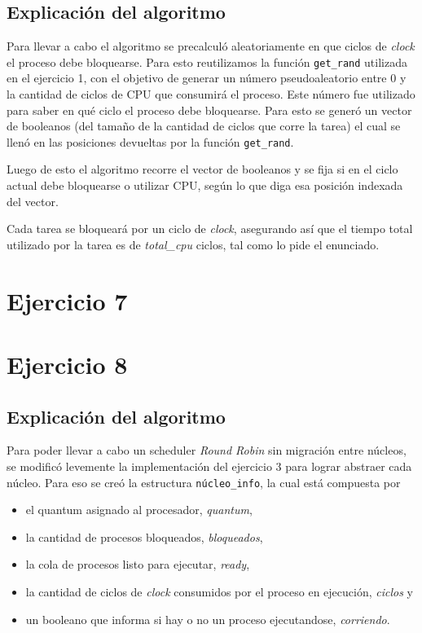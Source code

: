\documentclass[a4paper]{article}
\begin{document}
\subsection{Explicación del algoritmo}
Para llevar a cabo el algoritmo se precalculó aleatoriamente en que ciclos
de \textit{clock} el proceso debe bloquearse. Para esto reutilizamos la
función \verb|get_rand| utilizada en el ejercicio 1, con el objetivo de
generar un número pseudoaleatorio entre 0 y la cantidad de ciclos de CPU que
consumirá el proceso. Este número fue utilizado para saber en qué ciclo el
proceso debe bloquearse. Para esto se generó un vector de booleanos (del
tamaño de la cantidad de ciclos que corre la tarea) el cual se llenó en las
posiciones devueltas por la función \verb|get_rand|.

Luego de esto el algoritmo recorre el vector de booleanos y se fija si en
el ciclo actual debe bloquearse o utilizar CPU, según lo que diga esa
posición indexada del vector. 

Cada tarea se bloqueará por un ciclo de \textit{clock}, asegurando así que
el tiempo total utilizado por la tarea es de \textit{total\_cpu} ciclos,
tal como lo pide el enunciado.


\section{Ejercicio 7}

\newpage

\section{Ejercicio 8}

\subsection{Explicación del algoritmo}
Para poder llevar a cabo un scheduler \textit{Round Robin} sin migración
entre núcleos, se modificó levemente la implementación del ejercicio 3 para
lograr abstraer cada núcleo. Para eso se creó la estructura
\verb|núcleo_info|, la cual está compuesta por

\begin{itemize}
  \item el quantum asignado al procesador, \textit{quantum},
  \item la cantidad de procesos bloqueados, \textit{bloqueados},
  \item la cola de procesos listo para ejecutar, \textit{ready},
  \item la cantidad de ciclos de \textit{clock} consumidos por el proceso en
  ejecución, \textit{ciclos} y
  \item un booleano que informa si hay o no un proceso ejecutandose,
  \textit{corriendo}.
\end{itemize}
\end{document}
